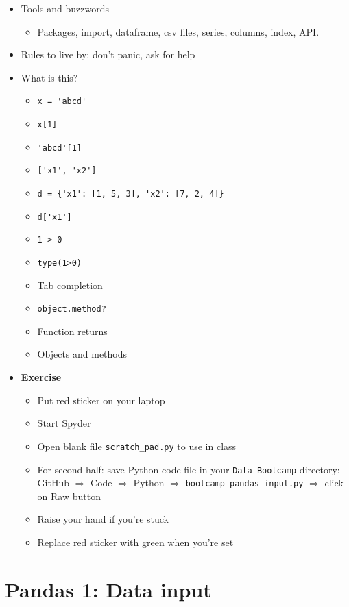 \documentclass[11pt]{article}
\begin{document}
\begin{itemize}
\item Tools and buzzwords
\begin{itemize}
\item Packages, import, dataframe, csv files, series, columns, index, API.
\end{itemize}

\item Rules to live by:  don't panic, ask for help

\item What is this?
\begin{itemize}
\item \verb|x = 'abcd'|
\item \verb|x[1]|
\item \verb|'abcd'[1]|
\item \verb|['x1', 'x2']|
\item \verb|d = {'x1': [1, 5, 3], 'x2': [7, 2, 4]}|
\item \verb|d['x1']|
\item \verb|1 > 0|
\item \verb|type(1>0)|
\item Tab completion
\item {\tt object.method?}
\item Function returns
\item Objects and methods
\end{itemize}

\item {\bf Exercise}
\begin{itemize}
\item Put red sticker on your laptop
\item Start Spyder
\item Open blank file \verb|scratch_pad.py| to use in class
\item For second half:  save Python code file in your \verb|Data_Bootcamp| directory: \\
GitHub $\Rightarrow$ Code $\Rightarrow$ Python $\Rightarrow$ \verb|bootcamp_pandas-input.py|
$\Rightarrow$ click on Raw button
\item Raise your hand if you're stuck
\item Replace red sticker with green when you're set
\end{itemize}

\end{itemize}


\section*{Pandas 1: Data input}
\end{document}
